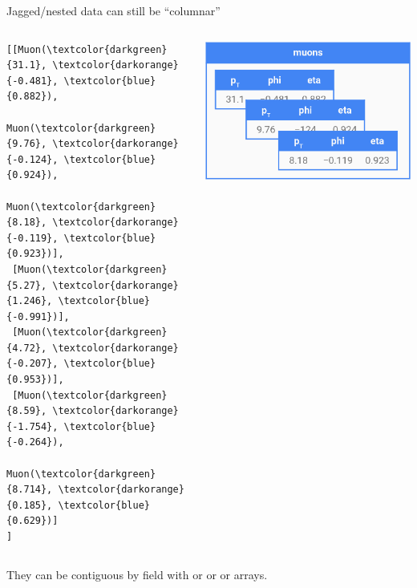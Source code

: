 \documentclass[aspectratio=169]{beamer}
\begin{document}
\begin{frame}[fragile]{Jagged/nested data can still be ``columnar''}
\vspace{0.5 cm}

\begin{columns}
\small
\begin{Verbatim}[commandchars=\\\{\}]
[[Muon(\textcolor{darkgreen}{31.1}, \textcolor{darkorange}{-0.481}, \textcolor{blue}{0.882}),
      Muon(\textcolor{darkgreen}{9.76}, \textcolor{darkorange}{-0.124}, \textcolor{blue}{0.924}),
      Muon(\textcolor{darkgreen}{8.18}, \textcolor{darkorange}{-0.119}, \textcolor{blue}{0.923})],
 [Muon(\textcolor{darkgreen}{5.27}, \textcolor{darkorange}{1.246}, \textcolor{blue}{-0.991})],
 [Muon(\textcolor{darkgreen}{4.72}, \textcolor{darkorange}{-0.207}, \textcolor{blue}{0.953})],
 [Muon(\textcolor{darkgreen}{8.59}, \textcolor{darkorange}{-1.754}, \textcolor{blue}{-0.264}),
      Muon(\textcolor{darkgreen}{8.714}, \textcolor{darkorange}{0.185}, \textcolor{blue}{0.629})]
]
\end{Verbatim}
\includegraphics[width=\linewidth]{muons-as-objects.png}
\end{columns}

\vspace{0.5 cm}
They can be contiguous by field with  or  or  or  arrays.


\end{frame}
\end{document}

